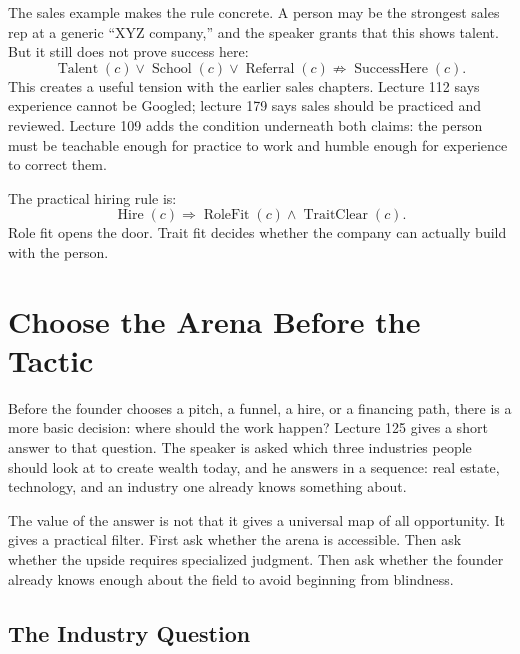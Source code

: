 \documentclass[11pt,oneside]{book}
\begin{document}
The sales example makes the rule concrete. A person may be the strongest sales rep at a generic ``XYZ company,'' and the speaker grants that this shows talent. But it still does not prove success here:
\[
\operatorname{Talent}(c)
\lor
\operatorname{School}(c)
\lor
\operatorname{Referral}(c)
\nRightarrow
\operatorname{SuccessHere}(c).
\]
This creates a useful tension with the earlier sales chapters. Lecture 112 says experience cannot be Googled; lecture 179 says sales should be practiced and reviewed. Lecture 109 adds the condition underneath both claims: the person must be teachable enough for practice to work and humble enough for experience to correct them.

The practical hiring rule is:
\[
\operatorname{Hire}(c)
\Rightarrow
\operatorname{RoleFit}(c)
\land
\operatorname{TraitClear}(c).
\]
Role fit opens the door. Trait fit decides whether the company can actually build with the person.


\chapter{Choose the Arena Before the Tactic}

Before the founder chooses a pitch, a funnel, a hire, or a financing path, there is a more basic decision: where should the work happen? Lecture 125 gives a short answer to that question. The speaker is asked which three industries people should look at to create wealth today, and he answers in a sequence: real estate, technology, and an industry one already knows something about.

The value of the answer is not that it gives a universal map of all opportunity. It gives a practical filter. First ask whether the arena is accessible. Then ask whether the upside requires specialized judgment. Then ask whether the founder already knows enough about the field to avoid beginning from blindness.

\section{The Industry Question}
\end{document}
